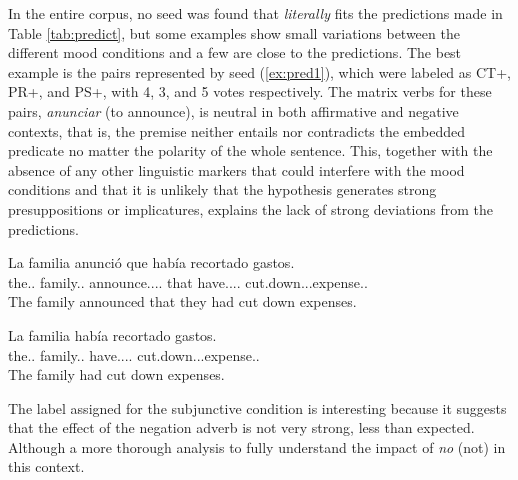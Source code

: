 In the entire corpus, no seed was found that \textit{literally} fits the predictions made in Table \ref{tab:predict}, but some examples show small variations between the different mood conditions and a few are close to the predictions. The best example is the pairs represented by seed (\ref{ex:pred1}), which were labeled as CT+, PR+, and PS+, with 4, 3, and 5 votes respectively. The matrix verbs for these pairs, \textit{anunciar} (to announce), is neutral in both affirmative and negative contexts, that is, the premise neither entails nor contradicts the embedded predicate no matter the polarity of the whole sentence. This, together with the absence of any other linguistic markers that could interfere with the mood conditions and that it is unlikely that the hypothesis generates strong presuppositions or implicatures, explains the lack of strong deviations from the predictions.\\ 

\begin{exe}
  \ex\label{ex:pred1}
    \begin{xlist}
      \item{\gll La familia anunció que había recortado gastos.\\ the.\F.\Sg{} family.\F.\Sg{} announce.\Pst.\Pfv.\Ind.\Tsg{} that have.\Pst.\Ipfv.\Ind.\Tsg{} cut.down.\Ptcp.\M.\Sg{}expense.\M.\Pl{} \\\glt The family announced that they had cut down expenses.}
      \item{\gll La familia había recortado gastos.\\ the.\F.\Sg{} family.\F.\Sg{} have.\Pst.\Ipfv.\Ind.\Tsg{} cut.down.\Ptcp.\M.\Sg{}expense.\M.\Pl{} \\\glt The family had cut down expenses.} \label{ex:hyppred1}
    \end{xlist}
\end{exe}

The label assigned for the subjunctive condition is interesting because it suggests that the effect of the negation adverb is not very strong, less than expected. Although a more thorough analysis to fully understand the impact of \textit{no} (not) in this context.\\

